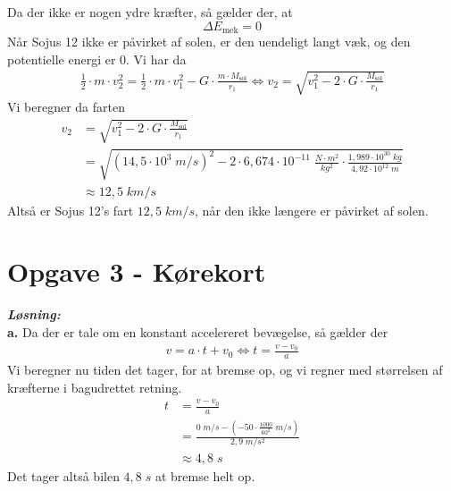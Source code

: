 \documentclass{report}
\newcommand{\sol}{\setlength{\parindent}{0cm}\textbf{\textit{Løsning:}}\setlength{\parindent}{1cm}}
\begin{document}
Da der ikke er nogen ydre kræfter, så gælder der, at
\[
\Delta E _{\text{mek} }=0
\] 
Når Sojus 12 ikke er påvirket af solen, er den uendeligt langt væk, og den potentielle energi er 0.
Vi har da 
\begin{equation*}
\begin{split}
  \frac{1}{2} \cdot m \cdot v_2^2=\frac{1}{2} \cdot m \cdot v_1^2 - G \cdot \frac{m \cdot M _{\text{sol} }}{r_1 } \iff v_2=\sqrt{v_1^2-2 \cdot G \cdot \frac{M _{\text{sol} }}{r_1}} 
\end{split}
\end{equation*}
Vi beregner da farten
\begin{equation*}
\begin{split}
  v_2&=\sqrt{v_1^2-2 \cdot G \cdot \frac{M _{\text{sol} }}{r_1}}\\
  &=\sqrt{\left(14,5 \cdot 10^3 \;\unit{m/s} \right)^2 - 2 \cdot 6,674 \cdot 10 ^{-11} \;\unit{\frac{N \cdot m^2}{kg^2}} \cdot \frac{1,989 \cdot 10 ^{30} \;\unit{kg} }{4,92 \cdot 10 ^{12} \;\unit{m} }} \\
  &\approx 12,5 \;\unit{km/s} 
\end{split}
\end{equation*}
Altså er Sojus 12's fart $12,5 \;\unit{km/s} $, når den ikke længere er påvirket af solen.
\section*{Opgave 3 - Kørekort}
\sol \\
\textbf{a.}
Da der er tale om en konstant accelereret bevægelse, så gælder der 
\begin{equation*}
\begin{split}
  v= a \cdot t + v_0 \iff t=\frac{v-v_0}{a}
\end{split}
\end{equation*}
Vi beregner nu tiden det tager, for at bremse op, og vi regner med størrelsen af kræfterne i bagudrettet retning.
\begin{equation*}
\begin{split}
  t&=\frac{v-v_0}{a}\\
  &=\frac{0 \;\unit{m/s} - \left(- 50 \cdot \frac{1000}{60^2} \;\unit{m/s} \right) }{2,9 \;\unit{m/s^2} }\\
  &\approx 4,8 \;\unit{s} 
\end{split}
\end{equation*}
Det tager altså bilen $4,8 \;\unit{s} $ at bremse helt op. 
\end{document}
